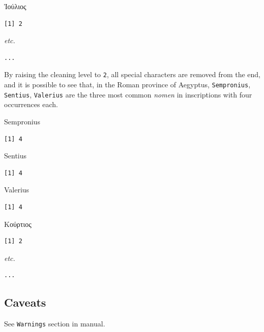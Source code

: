 \documentclass[a4paper,11pt]{memoir}
\newenvironment{Shaded}{\begin{snugshade}}{\end{snugshade}}
\newcommand{\CommentTok}[1]{\textcolor[rgb]{0.56,0.35,0.01}{\textit{#1}}}
\newcommand{\DataTypeTok}[1]{\textcolor[rgb]{0.13,0.29,0.53}{#1}}
\newcommand{\DecValTok}[1]{\textcolor[rgb]{0.00,0.00,0.81}{#1}}
\newcommand{\ErrorTok}[1]{\textcolor[rgb]{0.64,0.00,0.00}{\textbf{#1}}}
\newcommand{\KeywordTok}[1]{\textcolor[rgb]{0.13,0.29,0.53}{\textbf{#1}}}
\newcommand{\NormalTok}[1]{#1}
\newcommand{\OperatorTok}[1]{\textcolor[rgb]{0.81,0.36,0.00}{\textbf{#1}}}
\newcommand{\OtherTok}[1]{\textcolor[rgb]{0.56,0.35,0.01}{#1}}
\newcommand{\StringTok}[1]{\textcolor[rgb]{0.31,0.60,0.02}{#1}}
\begin{document}
Ἰούλιος

\begin{verbatim}
[1] 2
\end{verbatim}

\emph{etc.}

\begin{verbatim}
...
\end{verbatim}

By raising the cleaning level to \texttt{2}, all special characters are
removed from the end, and it is possible to see that, in the Roman
province of Aegyptus, \texttt{Sempronius}, \texttt{Sentius},
\texttt{Valerius} are the three most common \emph{nomen} in inscriptions
with four occurrences each.

\begin{Shaded}
\end{Shaded}

Sempronius

\begin{verbatim}
[1] 4
\end{verbatim}

Sentius

\begin{verbatim}
[1] 4
\end{verbatim}

Valerius

\begin{verbatim}
[1] 4
\end{verbatim}

Κούρτιος

\begin{verbatim}
[1] 2
\end{verbatim}

\emph{etc.}

\begin{verbatim}
...
\end{verbatim}

\hypertarget{caveats}{%
\subsection{Caveats}\label{caveats}}

See \texttt{Warnings} section in manual.
\end{document}
